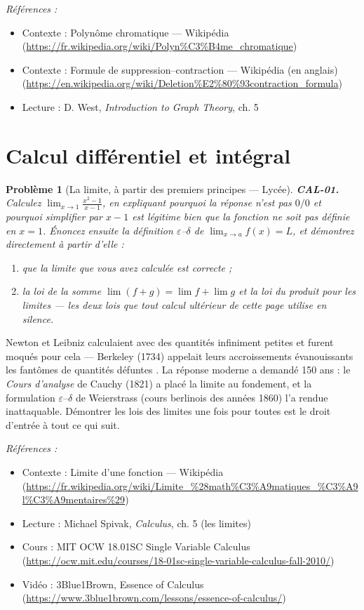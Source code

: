 \documentclass[11pt]{article}
\newtheorem{problem}{Problème}
\newenvironment{refs}{\par\small\noindent\emph{Références :}\begin{itemize}\setlength\itemsep{0pt}}{\end{itemize}\normalsize}
\begin{document}
\begin{refs}
\item Contexte : Polynôme chromatique --- Wikipédia (\url{https://fr.wikipedia.org/wiki/Polyn%C3%B4me_chromatique})
\item Contexte : Formule de suppression--contraction --- Wikipédia (en anglais) (\url{https://en.wikipedia.org/wiki/Deletion%E2%80%93contraction_formula})
\item Lecture : D. West, \textit{Introduction to Graph Theory}, ch. 5
\end{refs}

\bigskip


\section*{Calcul différentiel et intégral}

\begin{problem}[{La limite, à partir des premiers principes --- Lycée}]
\textbf{CAL-01.} Calculez
$ \lim_{x\to 1} \frac{x^2-1}{x-1} $,
en expliquant pourquoi la réponse n'est pas \og{} $0/0$ \fg{} et pourquoi simplifier par $ x-1 $ est
légitime bien que la fonction ne soit pas définie en $ x=1 $. Énoncez ensuite la définition
$\varepsilon$--$\delta$ de $ \lim_{x\to a} f(x)=L $, et démontrez directement à partir d'elle :
\begin{enumerate}
\item[(i)] que la limite que vous
avez calculée est correcte ;
\item[(ii)] la loi de la somme
$ \lim (f+g) = \lim f + \lim g $ et la loi du produit pour les limites --- les deux lois que
tout calcul ultérieur de cette page utilise en silence.
\end{enumerate}

\end{problem}

\noindent Newton et Leibniz calculaient avec des quantités \og{} infiniment petites \fg{}
et furent moqués pour cela --- Berkeley (1734) appelait leurs accroissements évanouissants
\og{} les fantômes de quantités défuntes \fg{}. La réponse moderne a demandé 150 ans : le
\textit{Cours d'analyse} de Cauchy (1821) a placé la limite au fondement, et la formulation
$\varepsilon$--$\delta$ de Weierstrass (cours berlinois des années 1860) l'a rendue inattaquable. Démontrer les lois
des limites une fois pour toutes est le droit d'entrée à tout ce qui suit.

\begin{refs}
\item Contexte : Limite d'une fonction --- Wikipédia (\url{https://fr.wikipedia.org/wiki/Limite_%28math%C3%A9matiques_%C3%A9l%C3%A9mentaires%29})
\item Lecture : Michael Spivak, \textit{Calculus}, ch. 5 (les limites)
\item Cours : MIT OCW 18.01SC Single Variable Calculus (\url{https://ocw.mit.edu/courses/18-01sc-single-variable-calculus-fall-2010/})
\item Vidéo : 3Blue1Brown, Essence of Calculus (\url{https://www.3blue1brown.com/lessons/essence-of-calculus/})
\end{refs}
\end{document}
